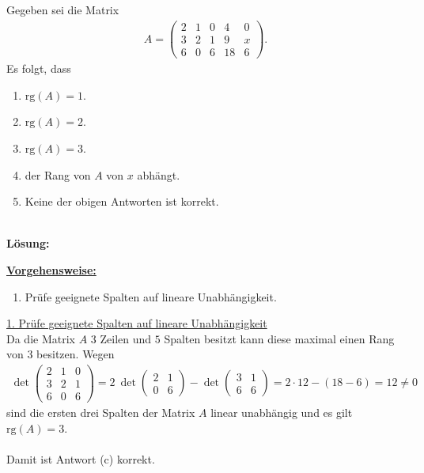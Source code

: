 \newpage

\subsection*{}
Gegeben sei die Matrix
\begin{align*}
	A =
	\begin{pmatrix}
		2 & 1 & 0 & 4 & 0 \\
		3 & 2 & 1 & 9 & x \\
		6 & 0 & 6 & 18 & 6 
	\end{pmatrix}.
\end{align*}
Es folgt, dass
\renewcommand{\labelenumi}{(\alph{enumi})}
\begin{enumerate}
	\item 
	$ \mathrm{rg}(A) = 1 $.
	\item 
	$ \mathrm{rg}(A) = 2 $.
	\item
	$ \mathrm{rg}(A) = 3 $.
	\item
	der Rang von $A$ von $x$ abhängt.
	\item
	Keine der obigen Antworten ist korrekt.
\end{enumerate}
\ \\
\textbf{Lösung:}
\begin{mdframed}
\underline{\textbf{Vorgehensweise:}}
\renewcommand{\labelenumi}{\theenumi.}
\begin{enumerate}
\item Prüfe geeignete Spalten auf lineare Unabhängigkeit.
\end{enumerate}
\end{mdframed}

\underline{1. Prüfe geeignete Spalten auf lineare Unabhängigkeit}\\
Da die Matrix $A $ $3$ Zeilen und $5$ Spalten besitzt kann diese maximal einen Rang von $3$ besitzen.
Wegen 
\begin{align*}
	\det
	\begin{pmatrix}
		2 & 1 & 0\\
		3 & 2 & 1\\
		6 & 0 & 6
	\end{pmatrix}
		=
	2 \ 
	\det
	\begin{pmatrix}
		2 & 1 \\
		0 & 6
	\end{pmatrix}
	-
	\det
	\begin{pmatrix}
	3 & 1 \\
	6 & 6
	\end{pmatrix}
	= 
	2 \cdot 12 - ( 18 - 6 )
	=
	12 \neq 0
\end{align*}
sind die ersten drei Spalten der Matrix $A$ linear unabhängig und es gilt $\mathrm{rg}(A) = 3$.\\
\\
Damit ist Antwort (c) korrekt.



